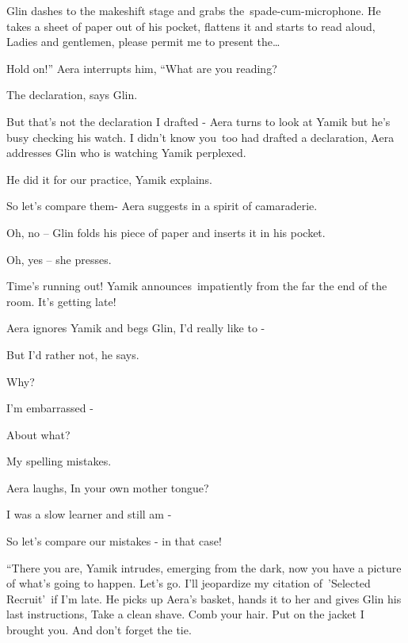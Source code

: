\documentclass[twoside,11pt]{book}
\begin{document}
Glin dashes to the makeshift stage and grabs the{\ }spade-cum-microphone. He takes a sheet of paper out
of his pocket, flattens it and starts to read aloud, {\textquotedbl}Ladies and gentlemen, please permit me to present
the{\dots} {\textquotedbl} 

{\textquotedbl}Hold on!'' Aera interrupts him, ``What are you reading?{\textquotedbl} 

{\textquotedbl}The declaration,{\textquotedbl} says Glin. 

{\textquotedbl}But that's not the declaration I drafted -{\textquotedbl} Aera turns to look at Yamik but he's busy
checking his watch. {\textquotedbl}I didn't know you\ too had drafted a declaration,{\textquotedbl} Aera addresses Glin
who is watching Yamik perplexed.

{\textquotedbl}He did it for our practice,{\textquotedbl} Yamik explains. 

{\textquotedbl}So let's compare them-{\textquotedbl} Aera suggests in a spirit of camaraderie.

{\textquotedbl}Oh, no --{\textquotedbl} Glin folds his piece of paper and inserts it in his pocket.\ 

{\textquotedbl}Oh, yes --{\textquotedbl} she presses.

{\textquotedbl}Time's running out!{\textquotedbl} Yamik announces~impatiently from the far the end of the room.
{\textquotedbl}It's getting late!{\textquotedbl}

Aera ignores Yamik and begs Glin, {\textquotedbl}I'd really like to -{\textquotedbl} 

{\textquotedbl}But I'd rather not,{\textquotedbl} he says. 

{\textquotedbl}Why?{\textquotedbl} 

{\textquotedbl}I'm embarrassed -{\textquotedbl} 

{\textquotedbl}About what?{\textquotedbl}~ 

{\textquotedbl}My spelling mistakes.{\textquotedbl} 

Aera laughs, {\textquotedbl}In your own mother tongue?{\textquotedbl} 

{\textquotedbl}I was a slow learner and still am -{\textquotedbl} 

{\textquotedbl}So let's compare our mistakes - in that case!{\textquotedbl} 

{}``There you are,{\textquotedbl} Yamik intrudes, emerging from the dark, {\textquotedbl}now you have a picture of
what's going to happen. Let's go. I'll jeopardize my citation of\ {}'Selected Recruit{}'\ if I'm late.{\textquotedbl}
He picks up Aera's basket, hands it to her and gives Glin his last instructions, {\textquotedbl}Take a clean shave.
Comb your hair. Put on the jacket I brought you. And don't forget the tie.{\textquotedbl} 
\end{document}
